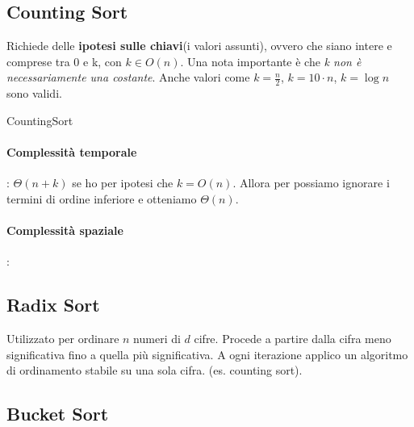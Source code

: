 \documentclass{article}
\begin{document}
\hypertarget{countingsort}{\subsection{Counting Sort}} %
Richiede delle \textbf{ipotesi sulle chiavi}(i valori assunti), ovvero che siano intere e comprese tra 0 e k, con \textbf{$k \in O(n)$}. Una nota importante è 
che \textit{k non è necessariamente una costante}. Anche valori come $k = \frac{n}{2}$, $k = 10 \cdot n$, $k = \log n$ sono validi.


\begin{algorithm}[H]
\caption{CountingSort}
\end{algorithm}
\paragraph{Complessità temporale}: $\Theta(n+k)$ se ho per ipotesi che $k = O(n)$. Allora per possiamo ignorare i termini di ordine inferiore e otteniamo $\Theta(n)$.
\paragraph{Complessità spaziale}: 


\hypertarget{radix}{\subsection{Radix Sort}} %
Utilizzato per ordinare $n$ numeri di $d$ cifre. Procede a partire dalla cifra meno significativa fino a quella più significativa. A ogni iterazione applico un 
algoritmo di ordinamento stabile su una sola cifra. (es. counting sort).

\hypertarget{bucketsort}{\subsection{Bucket Sort}} %
\newpage
\end{document}

